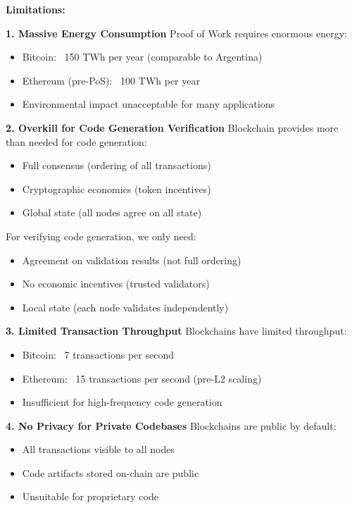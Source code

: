 \textbf{Limitations:}

\textbf{1. Massive Energy Consumption}
Proof of Work requires enormous energy:
\begin{itemize}
    \item Bitcoin: ~150 TWh per year (comparable to Argentina)
    \item Ethereum (pre-PoS): ~100 TWh per year
    \item Environmental impact unacceptable for many applications
\end{itemize}

\textbf{2. Overkill for Code Generation Verification}
Blockchain provides more than needed for code generation:
\begin{itemize}
    \item Full consensus (ordering of all transactions)
    \item Cryptographic economics (token incentives)
    \item Global state (all nodes agree on all state)
\end{itemize}

For verifying code generation, we only need:
\begin{itemize}
    \item Agreement on validation results (not full ordering)
    \item No economic incentives (trusted validators)
    \item Local state (each node validates independently)
\end{itemize}

\textbf{3. Limited Transaction Throughput}
Blockchains have limited throughput:
\begin{itemize}
    \item Bitcoin: ~7 transactions per second
    \item Ethereum: ~15 transactions per second (pre-L2 scaling)
    \item Insufficient for high-frequency code generation
\end{itemize}

\textbf{4. No Privacy for Private Codebases}
Blockchains are public by default:
\begin{itemize}
    \item All transactions visible to all nodes
    \item Code artifacts stored on-chain are public
    \item Unsuitable for proprietary code
\end{itemize}

